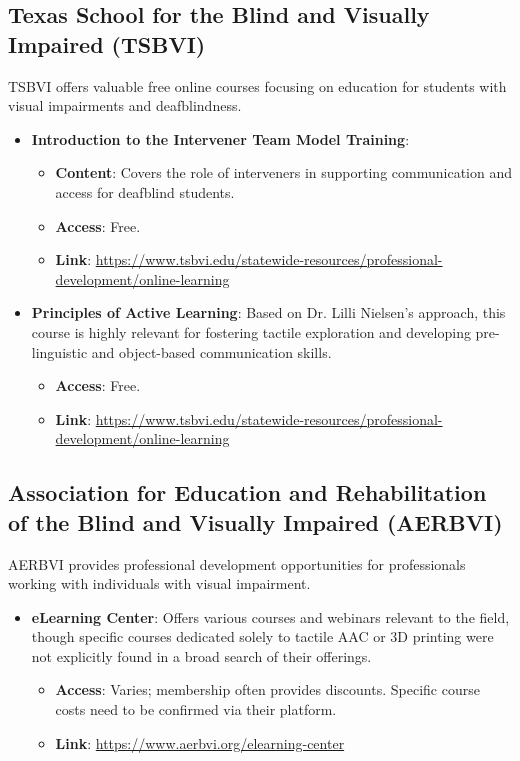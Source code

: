 \subsection{Texas School for the Blind and Visually Impaired (TSBVI)}
TSBVI offers valuable free online courses focusing on education for students with visual impairments and deafblindness.
\begin{itemize}
    \item \textbf{Introduction to the Intervener Team Model Training}:
    \begin{itemize}
        \item \textbf{Content}: Covers the role of interveners in supporting communication and access for deafblind students.
        \item \textbf{Access}: Free.
        \item \textbf{Link}: \url{https://www.tsbvi.edu/statewide-resources/professional-development/online-learning}
    \end{itemize}
    \item \textbf{Principles of Active Learning}: Based on Dr. Lilli Nielsen's approach, this course is highly relevant for fostering tactile exploration and developing pre-linguistic and object-based communication skills.
    \begin{itemize}
        \item \textbf{Access}: Free.
        \item \textbf{Link}: \url{https://www.tsbvi.edu/statewide-resources/professional-development/online-learning}
    \end{itemize}
\end{itemize}

\subsection{Association for Education and Rehabilitation of the Blind and Visually Impaired (AERBVI)}
AERBVI provides professional development opportunities for professionals working with individuals with visual impairment.
\begin{itemize}
    \item \textbf{eLearning Center}: Offers various courses and webinars relevant to the field, though specific courses dedicated solely to tactile AAC or 3D printing were not explicitly found in a broad search of their offerings.
    \begin{itemize}
        \item \textbf{Access}: Varies; membership often provides discounts. Specific course costs need to be confirmed via their platform.
        \item \textbf{Link}: \url{https://www.aerbvi.org/elearning-center}
    \end{itemize}
\end{itemize}

